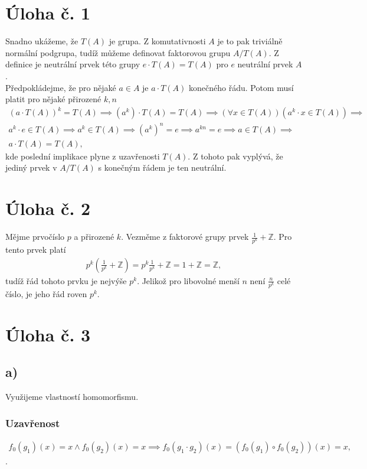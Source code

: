 \documentclass{scrartcl}
\begin{document}
    \section*{Úloha č. 1}
    Snadno ukážeme, že $T(A)$ je grupa. Z komutativnosti $A$ je to pak triviálně normální podgrupa, tudíž můžeme definovat faktorovou grupu $A/T(A)$. Z definice je neutrální prvek této grupy $e \cdot T(A) = T(A)$ pro $e$ neutrální prvek $A$.\\

    Předpokládejme, že pro nějaké $a \in A$ je $a \cdot T(A)$ konečného řádu. Potom musí platit pro nějaké přirozené $k,n$
    \begin{align*}
        (a\cdot T(A))^k = T(A) \implies
        (a^k) \cdot T(A) = T(A) \implies
        (\forall x \in T(A))(a^k \cdot x \in T(A)) \implies \\
        a^k \cdot e \in T(A) \implies a^k \in T(A) \implies
        {(a^k)}^n = e \implies a^{kn} = e \implies 
        a \in T(A) \implies \\ a\cdot T(A) = T(A),
    \end{align*}
    kde poslední implikace plyne z uzavřenosti $T(A)$. Z tohoto pak vyplývá, že jediný prvek v $A/T(A)$ s konečným řádem je ten neutrální.
    
    \section*{Úloha č. 2}
    Mějme prvočíslo $p$ a přirozené $k$. Vezměme z faktorové grupy prvek $\frac{1}{p^k} + \mathbb{Z}$. Pro tento prvek platí
    \begin{align*}
        p^k\left(\frac{1}{p^k} + \mathbb{Z}\right) = p^k\frac{1}{p^k} + \mathbb{Z} = 1 + \mathbb{Z} = \mathbb{Z},
    \end{align*}
    tudíž řád tohoto prvku je nejvýše $p^k$. Jelikož pro libovolné menší $n$ není $\frac{n}{p^k}$ celé číslo, je jeho řád roven $p^k$.

    \section*{Úloha č. 3}
    \subsection*{a)}
    Využijeme vlastností homomorfismu.
    \subsubsection*{Uzavřenost}
    \begin{align*}
        f_0(g_1)(x) = x \land f_0(g_2)(x) = x \implies f_0(g_1 \cdot g_2)(x) = (f_0(g_1) \circ f_0(g_2))(x) = x,
    \end{align*}.
\end{document}
